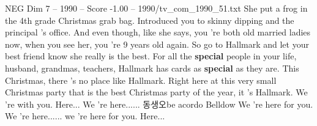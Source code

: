\begin{textsample}{NEG Dim 7 – 1990 – Score -1.00 – 1990/tv\_com\_1990\_51.txt}  \label{ex:f7_neg_032}
She put a frog in the 4th grade Christmas grab bag.
Introduced you to skinny dipping and the principal 's office.
And even though, like she says, you 're both old married ladies now, when you see her, you 're 9 years old again.
So go to Hallmark and let your best friend know she really is the best.
For all the \textbf{special} people in your life, husband, grandmas, teachers, Hallmark has cards as \textbf{special} as they are.
This Christmas, there 's no place like Hallmark.
Right here at this very small Christmas party that is the best Christmas party of the year, it 's Hallmark.
We 're with you.
Here...
We 're here...... 동생오be acordo Belldow We 're here for you.
We 're here...... we 're here for you.
Here...

\end{textsample}
